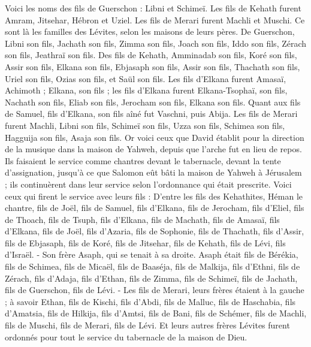 \begin{multicols}{2}
Voici les noms des fils de Guerschon : Libni et Schimeï.
Les fils de Kehath furent Amram, Jitsehar, Hébron et Uziel.
Les fils de Merari furent  Machli et Muschi. Ce sont là les familles des Lévites, selon les maisons de leurs pères.
De Guerschon, Libni son fils, Jachath son fils, Zimma son fils,
Joach son fils, Iddo son fils, Zérach son fils, Jeathraï son fils.
Des fils de Kehath, Amminadab son fils, Koré son fils, Assir son fils,
Elkana son fils, Ebjasaph son fils, Assir son fils,
Thachath son fils, Uriel son fils, Ozias son fils, et Saül son fils.
Les fils d’Elkana furent  Amasaï, Achimoth ;
Elkana, son fils ; les fils d’Elkana furent Elkana-Tsophaï, son fils, Nachath son fils,
Eliab son fils, Jerocham son fils, Elkana son fils.
Quant aux fils de Samuel, fils d'Elkana, son fils aîné fut Vaschni, puis Abija.
Les fils de Merari furent Machli, Libni son fils, Schimeï son fils, Uzza son fils,
Schimea son fils, Hagguija son fils, Asaja son fils.
Or voici ceux que David établit pour la direction de la musique dans la maison de Yahweh, depuis que l’arche fut en lieu de repos.
Ils faisaient le service comme chantres devant le tabernacle, devant la tente d'assignation, jusqu'à ce que Salomon eût bâti la maison de Yahweh à Jérusalem ; ils continuèrent dans leur service selon l'ordonnance qui était prescrite. Voici ceux qui firent le service avec leurs fils : D'entre les fils des Kehathites, Héman le chantre, fils de Joël, fils de Samuel,
fils d'Elkana, fils de Jerocham, fils d’Eliel, fils de Thoach,
fils de Tsuph, fils d'Elkana, fils de Machath, fils de Amasaï,
fils d'Elkana, fils de Joël, fils d’Azaria, fils de Sophonie,
fils de Thachath, fils d'Assir, fils de Ebjasaph, fils de Koré,
fils de Jitsehar, fils de Kehath, fils de Lévi, fils d'Israël.
- Son frère Asaph, qui se tenait à sa droite. Asaph était fils de Bérékia, fils de Schimea,
fils de Micaël, fils de Baaséja, fils de Malkija,
fils d’Ethni, fils de Zérach, fils d’Adaja,
fils d'Ethan, fils de Zimma, fils de Schimeï,
fils de Jachath, fils de Guerschon, fils de Lévi.
- Les fils de Merari, leurs frères étaient à la gauche ; à savoir Ethan, fils de Kischi, fils d’Abdi, fils de Malluc,
fils de Haschabia, fils d'Amatsia, fils de Hilkija,
fils d'Amtsi, fils de Bani, fils de Schémer,
fils de Machli, fils de Muschi, fils de Merari, fils de Lévi.
Et leurs autres frères Lévites furent ordonnés pour tout le service du tabernacle de la maison de Dieu.

\end{multicols}
